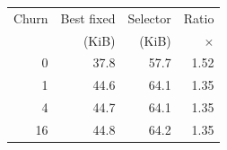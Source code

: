 \begin{tabular}{@{}rrrr@{}}
\toprule
Churn & Best fixed & Selector & Ratio\\
 & (KiB) & (KiB) & $\times$\\
\midrule
0 & 37.8 & 57.7 & 1.52\\
1 & 44.6 & 64.1 & 1.35\\
4 & 44.7 & 64.1 & 1.35\\
16 & 44.8 & 64.2 & 1.35\\
\bottomrule
\end{tabular}
